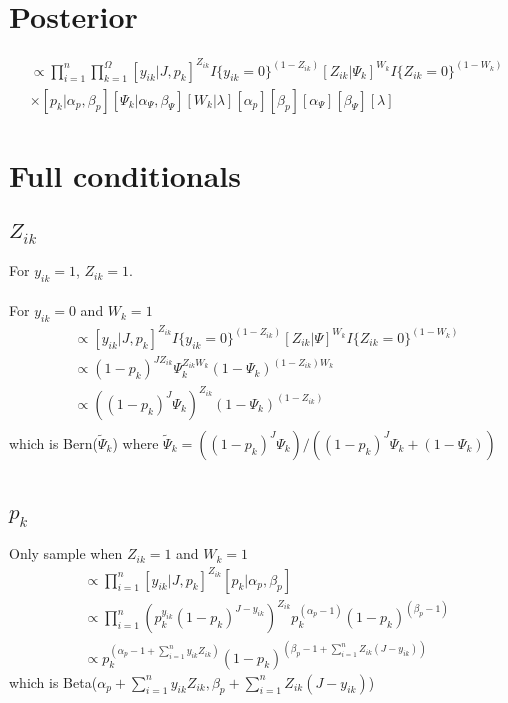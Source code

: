\documentclass[fleqn]{article}
\def\bm#1{\mbox{\boldmath $#1$}}
\begin{document}
\section{Posterior}
%
\begin{align*}
  [\bm{Z}, \bm{p}, \bm{\Psi}, \bm{W}, \alpha_p, \beta_p, \alpha_\Psi, \beta_\Psi, \lambda | \bm{y}, J] & \propto \prod_{i = 1}^n \prod_{k = 1}^\Omega [y_{ik} | J, p_k]^{Z_{ik}} I\{y_{ik} = 0 \}^{(1 -  Z_{ik})} [Z_{ik} | \Psi_k]^{W_k} I\{Z_{ik} = 0 \}^{(1 -  W_k)}\\
  & \times [p_k | \alpha_p, \beta_p] [\Psi_k | \alpha_\Psi, \beta_\Psi] [W_k | \lambda] [\alpha_p] [\beta_p] [\alpha_\Psi] [\beta_\Psi] [\lambda]
\end{align*}
%
\section{Full conditionals}
%
\subsection{$Z_{ik}$}
%
For $y_{ik} = 1$, $Z_{ik} = 1$.\\
\\
For $y_{ik} = 0$ and $W_k = 1$
\begin{align*}
  [Z_{ik} | \cdot] & \propto [y_{ik} | J, p_k]^{Z_{ik}} I \{y_{ik} = 0 \}^{(1 - Z_{ik})} [Z_{ik} | \Psi]^{W_k} I \{Z_{ik} = 0 \}^{(1 - W_{k})}\\
  & \propto (1 - p_k)^{J Z_{ik}} \Psi_k^{Z_{ik} W_k} (1 - \Psi_k)^{(1 - Z_{ik}) W_k}\\
  & \propto \left( (1 - p_k)^J \Psi_k \right)^{Z_{ik}} \left(1 - \Psi_k \right)^{(1 - Z_{ik})}\\
\end{align*}
which is Bern($\tilde{\Psi}_k$) where $\tilde{\Psi}_k = \left( (1 - p_k)^J \Psi_k \right) / \left( (1 - p_k)^J \Psi_k + (1 - \Psi_k)\right)$\\
\\
%
\subsection{$p_k$}
%
Only sample when $Z_{ik} = 1$ and $W_k = 1$
\begin{align*}
  [p_k | \cdot] & \propto \prod_{i = 1}^n [y_{ik} | J, p_k]^{Z_{ik}} [p_k | \alpha_p, \beta_p]\\
  & \propto \prod_{i = 1}^n \left( p_k^{y_{ik}} (1 - p_k)^{J - y_{ik}} \right)^{Z_{ik}} p_k^{(\alpha_p - 1)} (1 - p_k)^{(\beta_p - 1)}\\
    & \propto p_k^{\left( \alpha_p - 1 + \sum_{i = 1}^n y_{ik} Z_{ik} \right)} (1 - p_k)^{\left( \beta_p - 1 + \sum_{i = 1}^n Z_{ik} (J - y_{ik}) \right)}
\end{align*}
%
which is Beta($\alpha_p + \sum_{i = 1}^n y_{ik} Z_{ik}, \beta_p + \sum_{i = 1}^n Z_{ik} (J - y_{ik})$)
%
\end{document}
